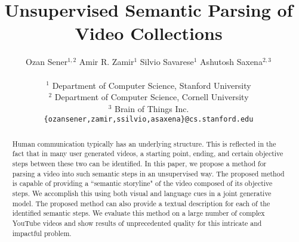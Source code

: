 \documentclass[10pt,twocolumn,letterpaper]{article}
\begin{document}
\title{Unsupervised Semantic Parsing of Video Collections}



\author{ Ozan Sener$^{1,2}$ \;\; Amir R. Zamir$^{1}$ \;\; Silvio Savarese$^{1}$ \;\; Ashutosh Saxena$^{2,3}$  \\ \\
$^1$ Department of Computer Science, Stanford University\\
$^2$ Department of Computer Science, Cornell University\\
$^3$ Brain of Things Inc.\\
{\tt\small \{ozansener,zamir,ssilvio,asaxena\}@cs.stanford.edu}
}
\maketitle


\begin{spacing}{0.98}
\begin{abstract}
\vspace{-2mm}
Human communication typically has an underlying structure. This is reflected in the fact that in many user generated videos, a starting point, ending, and certain objective steps between these two can be identified. In this paper, we propose a method for parsing a video into such semantic steps in an unsupervised way. The proposed method is capable of providing a ``semantic storyline" of the video composed of its objective steps. We accomplish this using both visual and language cues in a joint generative model. The proposed method can also provide a textual description for each of the identified semantic steps. We evaluate this method on a large number of complex YouTube videos and show results of unprecedented quality for this intricate and impactful problem.
\end{abstract}
\vspace{-5mm}







%
\end{spacing}
{\footnotesize
\begin{spacing}{0.88}


\end{spacing}
}
\end{document}
